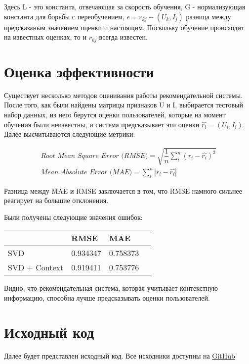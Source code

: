 Здесь L - это константа, отвечающая за скорость обучения, G - нормализующая константа для борьбы с переобучением, $e = r_{kj} - (U_k, I_j)$ разница между предсказаным значением оценки и настоящим. Поскольку обучение происходит на известных оценках, то и $r_{kj}$ всегда известен.

\section{Оценка эффективности}

Существует несколько методов оценивания работы рекомендательной системы. После того, как были найдены матрицы признаков U и I, выбирается тестовый набор данных, из него берутся оценки пользователей, которые на момент обучения были неизвестны, и система предсказывает эти оценки $\widehat{r_i} = (U_i, I_i)$. Далее высчитываются следующие метрики:

\begin{gather*}
\textit{Root Mean Square Error (RMSE)} = \sqrt{\dfrac{1}{n}\sum_i^n (r_i - \widehat{r_i})^2} \\
\textit{Mean Absolute Error (MAE)} = \sum_i^n |r_i - \widehat{r_i}|
\end{gather*}

Разница между MAE и RMSE заключается в том, что RMSE намного сильнее реагирует на большие отклонения. 

Были получены следующие значения ошибок:

\begin{center}
  \begin{tabular}{| C{3.5cm} | C{1.5cm} | C{1.5cm} | @{}m{0pt}@{}}
    \hline
     & RMSE & MAE & \\[0.5em] \hline
    SVD & 0.934347 & 0.758373 & \\[1.4em] \hline
    SVD + Context & 0.919411 & 0.753776 & \\[1.4em]
    \hline
  \end{tabular}
\end{center}

Видно, что рекомендательная система, которая учитывает контекстную информацию, способна лучше предсказывать оценки пользователей.

\section{Исходный код}

Далее будет представлен исходный код. Все исходники доступны на \href{https://github.com/Makazone/2ndYear-TermProject}{GitHub}






